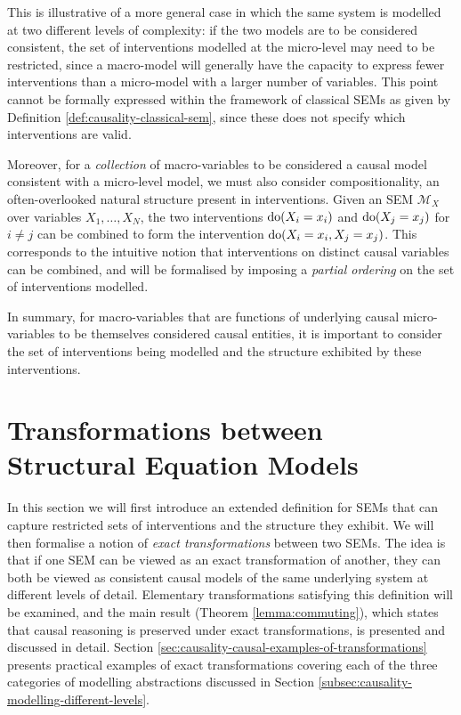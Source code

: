This is illustrative of a more general case in which the same system is modelled at two different levels of complexity: if the two models are to be considered consistent, the set of interventions modelled at the micro-level may need to be restricted, since a macro-model will generally have the capacity to express fewer interventions than a micro-model with a larger number of variables. 
This point cannot be formally expressed within the framework of classical SEMs as given by Definition \ref{def:causality-classical-sem}, since these does not specify which interventions are valid. 

Moreover, for a \emph{collection} of macro-variables to be considered a causal model consistent with a micro-level model, we must also consider compositionality, an often-overlooked natural structure present in interventions.
Given an SEM $\mathcal{M}_X$ over variables $X_1, \ldots, X_N$, the two interventions $\operatorname{do}(X_i=x_i)$ and $\operatorname{do}(X_j=x_j)$ for $i\not=j$  can be combined to form the intervention $\operatorname{do}(X_i=x_i, X_j=x_j)$. 
This corresponds to the intuitive notion that interventions on distinct causal variables can be combined, and will be formalised by imposing a \emph{partial ordering} on the set of interventions modelled.

In summary, for macro-variables that are functions of underlying causal micro-variables to be themselves considered causal entities, it is important to consider the set of interventions being modelled and the structure exhibited by these interventions.


\section{Transformations between Structural Equation Models}\label{sec:causality-transformations-between-sems}

In this section we will first introduce an extended definition for SEMs that can capture restricted sets of interventions and the structure they exhibit.
We will then formalise a notion of \emph{exact transformations} between two SEMs. 
The idea is that if one SEM can be viewed as an exact transformation of another, they can both be viewed as consistent causal models of the same underlying system at different levels of detail. 
Elementary transformations satisfying this definition will be examined, and the main result (Theorem \ref{lemma:commuting}), which states that causal reasoning is preserved under exact transformations, is presented and discussed in detail.
Section \ref{sec:causality-causal-examples-of-transformations} presents practical examples of exact transformations covering each of the three categories of modelling abstractions discussed in Section \ref{subsec:causality-modelling-different-levels}.


